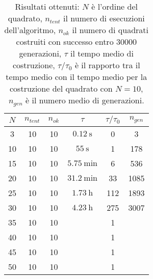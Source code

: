 \documentclass[italian,twoside,twocolumn]{article}
\begin{document}
\begin{table}[htbp]
	\centering
	\caption{Risultati ottenuti: $ N $ è l'ordine del quadrato, $ n_{tent} $ il numero di esecuzioni dell'algoritmo, $ n_{ok} $ il numero di quadrati costruiti con successo entro $ \num{30000} $ generazioni, $ \tau $ il tempo medio di costruzione, $ \tau \slash \tau_0 $ è il rapporto tra il tempo medio con il tempo medio per la costruzione del quadrato con $ N = 10 $, $ n_{gen} $ è il numero medio di generazioni.}
\begin{tabular}{c|ccccc}
	\hline
	$ N $ & $ n_{tent} $ & $ n_{ok} $ &        $ \tau $        & $ \tau \slash \tau_0 $ & $ n_{gen} $ \\ \hline
	  3   &      10      &     10     & $ \SI{0.12}{\second} $ &           0            &     3       \\
	 10   &      10      &     10     &  $ \SI{55}{\second} $  &           1            &     178     \\
	 15   &      10      &     10     & $ \SI{5.75}{\minute} $ &           6            &     536     \\
	 20   &      10      &     10     & $ \SI{31.2}{\minute} $ &           33           &    1085     \\
	 25   &      10      &     10     &  $ \SI{1.73}{\hour} $  &           112          &    1893     \\
	 30   &      10      &     10     &  $ \SI{4.23}{\hour} $  &           275          &    3007     \\
	 35   &      10      &     10     &                        &           1            &  \\
	 40   &      10      &     10     &                        &           1            &  \\
	 45   &      10      &     10     &                        &           1            &  \\
	 50   &      10      &     10     &                        &           1            &  \\ \hline
\end{tabular} 
\label{tab:risultati_xie_kang}
\end{table}
\end{document}
